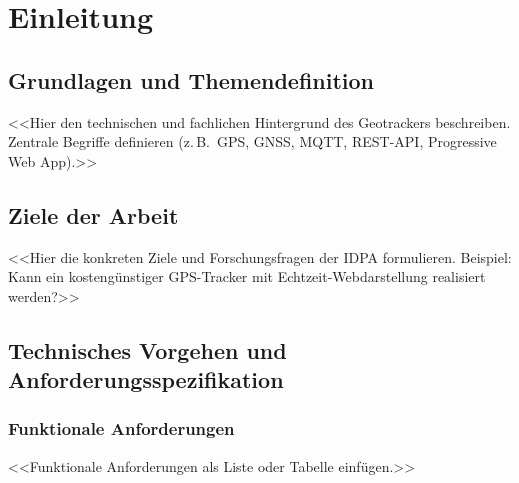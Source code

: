 
\chapter{Einleitung}

\section{Grundlagen und Themendefinition}

<<Hier den technischen und fachlichen Hintergrund des Geotrackers beschreiben.
Zentrale Begriffe definieren (z.\,B.\ GPS, GNSS, MQTT, REST-API, Progressive
Web App).>>

\section{Ziele der Arbeit}

<<Hier die konkreten Ziele und Forschungsfragen der IDPA formulieren.
Beispiel: Kann ein kostengünstiger GPS-Tracker mit Echtzeit-Webdarstellung
realisiert werden?>>

\section{Technisches Vorgehen und Anforderungsspezifikation}

\subsection{Funktionale Anforderungen}
<<Funktionale Anforderungen als Liste oder Tabelle einfügen.>>

